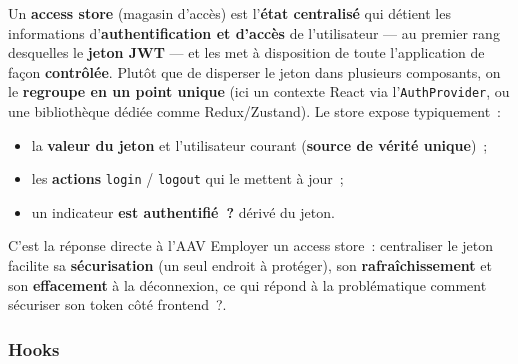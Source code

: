 \noindent Un \textbf{access store} (\og{}magasin d'accès\fg{}) est l'\textbf{état centralisé} qui détient les informations d'\textbf{authentification et d'accès} de l'utilisateur — au premier rang desquelles le \textbf{jeton JWT} — et les met à disposition de toute l'application de façon \textbf{contrôlée}. Plutôt que de disperser le jeton dans plusieurs composants, on le \textbf{regroupe en un point unique} (ici un contexte React via l'\texttt{AuthProvider}, ou une bibliothèque dédiée comme Redux/Zustand). Le store expose typiquement~:
\begin{itemize}
	\item la \textbf{valeur du jeton} et l'utilisateur courant (\textbf{source de vérité unique})~;
	\item les \textbf{actions} \texttt{login} / \texttt{logout} qui le mettent à jour~;
	\item un indicateur \textbf{\og{}est authentifié~?\fg{}} dérivé du jeton.
\end{itemize}
\noindent C'est la réponse directe à l'AAV \og{}Employer un access store\fg{}~: centraliser le jeton facilite sa \textbf{sécurisation} (un seul endroit à protéger), son \textbf{rafraîchissement} et son \textbf{effacement} à la déconnexion, ce qui répond à la problématique \og{}comment sécuriser son token côté frontend~?\fg{}.

\newpage

\subsubsection*{Hooks}
{}

